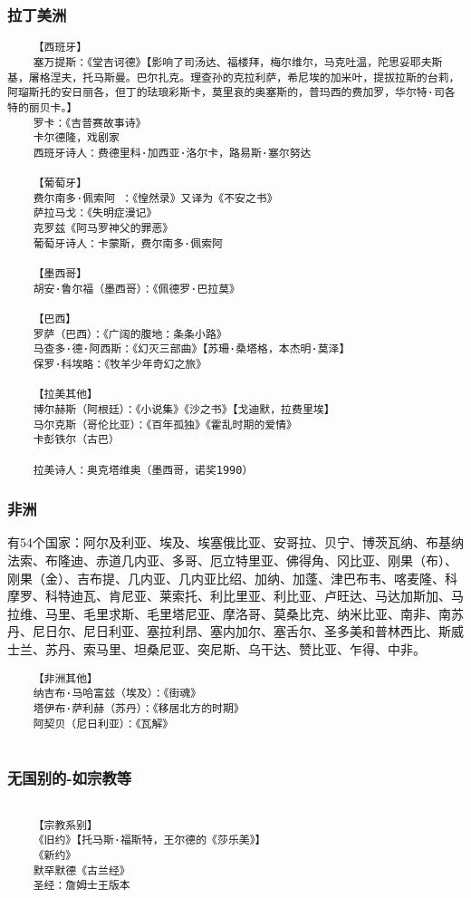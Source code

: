 \documentclass[UTF8]{../RepresentationUniverse}
\begin{document}
\subsubsection{拉丁美洲}
\begin{lstlisting}
    【西班牙】
    塞万提斯：《堂吉诃德》【影响了司汤达、福楼拜，梅尔维尔，马克吐温，陀思妥耶夫斯基，屠格涅夫，托马斯曼。巴尔扎克。理查孙的克拉利萨，希尼埃的加米叶，提拔拉斯的台莉，阿瑠斯托的安日丽各，但丁的珐琅彩斯卡，莫里哀的奥塞斯的，普玛西的费加罗，华尔特·司各特的丽贝卡。】
    罗卡：《吉普赛故事诗》
    卡尔德隆，戏剧家
    西班牙诗人：费德里科·加西亚·洛尔卡，路易斯·塞尔努达
    
    【葡萄牙】
    费尔南多·佩索阿 ：《惶然录》又译为《不安之书》
    萨拉马戈：《失明症漫记》
    克罗兹《阿马罗神父的罪恶》
    葡萄牙诗人：卡蒙斯，费尔南多·佩索阿

    【墨西哥】
    胡安·鲁尔福（墨西哥）：《佩德罗·巴拉莫》

    【巴西】
    罗萨（巴西）：《广阔的腹地：条条小路》
    马查多·德·阿西斯：《幻灭三部曲》【苏珊·桑塔格，本杰明·莫泽】
    保罗·科埃略：《牧羊少年奇幻之旅》

    【拉美其他】
    博尔赫斯（阿根廷）：《小说集》《沙之书》【戈迪默，拉费里埃】
    马尔克斯（哥伦比亚）：《百年孤独》《霍乱时期的爱情》
    卡彭铁尔（古巴）

    拉美诗人：奥克塔维奥（墨西哥，诺奖1990）
\end{lstlisting}


\subsubsection{非洲}
有54个国家：阿尔及利亚、埃及、埃塞俄比亚、安哥拉、贝宁、博茨瓦纳、布基纳法索、布隆迪、赤道几内亚、多哥、厄立特里亚、佛得角、冈比亚、刚果（布）、刚果（金）、吉布提、几内亚、几内亚比绍、加纳、加蓬、津巴布韦、喀麦隆、科摩罗、科特迪瓦、肯尼亚、莱索托、利比里亚、利比亚、卢旺达、马达加斯加、马拉维、马里、毛里求斯、毛里塔尼亚、摩洛哥、莫桑比克、纳米比亚、南非、南苏丹、尼日尔、尼日利亚、塞拉利昂、塞内加尔、塞舌尔、圣多美和普林西比、斯威士兰、苏丹、索马里、坦桑尼亚、突尼斯、乌干达、赞比亚、乍得、中非。
\begin{lstlisting}
    【非洲其他】
    纳吉布·马哈富兹（埃及）：《街魂》
    塔伊布·萨利赫（苏丹）：《移居北方的时期》
    阿契贝（尼日利亚）：《瓦解》
    
\end{lstlisting}


\subsubsection{无国别的-如宗教等}
\begin{lstlisting}

    【宗教系别】
    《旧约》【托马斯·福斯特，王尔德的《莎乐美》】
    《新约》
    默罕默德《古兰经》
    圣经：詹姆士王版本
\end{lstlisting}
\end{document}

